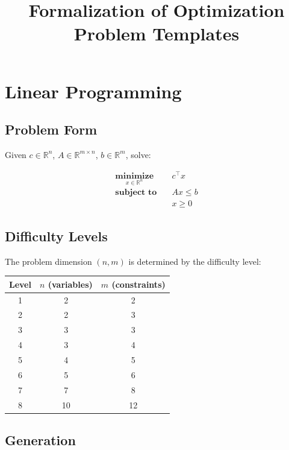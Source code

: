 \documentclass[12pt]{article}
\title{Formalization of Optimization Problem Templates}
\date{}
\begin{document}
\maketitle

\section{Linear Programming}

\subsection{Problem Form}

Given $c \in \mathbb{R}^n$, $A \in \mathbb{R}^{m \times n}$, $b \in \mathbb{R}^m$, solve:

\begin{align*}
    \underset{x \in \mathbb{R}^n}{\textbf{minimize}}   \quad & c^\top x \\
    \textbf{subject to} \quad                                  & Ax \leq b \\
                                                               & x \geq 0
\end{align*}

\subsection{Difficulty Levels}

The problem dimension $(n, m)$ is determined by the difficulty level:

\begin{center}
\begin{tabular}{c|cc}
\hline
\textbf{Level} & $n$ (variables) & $m$ (constraints) \\
\hline
1 & 2  & 2  \\
2 & 2  & 3  \\
3 & 3  & 3  \\
4 & 3  & 4  \\
5 & 4  & 5  \\
6 & 5  & 6  \\
7 & 7  & 8  \\
8 & 10 & 12 \\
\hline
\end{tabular}
\end{center}

\subsection{Generation}
\end{document}
